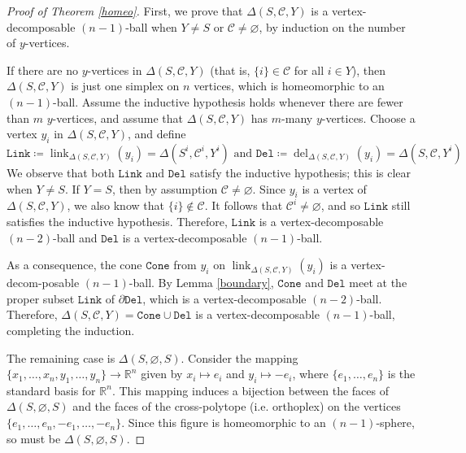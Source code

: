 \documentclass[ALCO,published]{cedram}
\numberwithin{equation}{section}
\newcommand{\R}{\mathbb{R}}
\newcommand{\sC}{\mathscr{C}}
\newcommand{\D}{\mathtt{Del}}
\renewcommand{\emptyset}{\varnothing}
\newcommand{\dee}{\partial}
\newcommand{\Cone}{\mathtt{Cone}}
\DeclareMathOperator{\del}{\mathrm{del}}
\DeclareMathOperator{\link}{\mathrm{link}}
\newcommand{\Link}{\mathtt{Link}}
\newcommand{\1}{^{-1}}
\begin{document}

\begin{proof}[Proof of Theorem \ref{homeo}]
First, we prove that $\Delta(S,\sC,Y)$ is a vertex-decomposable $(n-1)$-ball when $Y\neq S$ or $\sC\neq \emptyset$, by induction on the number of $y$-vertices.

If there are no $y$-vertices in $\Delta(S,\sC,Y)$ (that is, $\{i\}\in \sC$ for all $i\in Y$), then $\Delta(S,\sC,Y)$ is just one simplex on $n$ vertices, which is homeomorphic to an $(n-1)$-ball. Assume the inductive hypothesis holds whenever there are fewer than $m$ $y$-vertices, and assume that $\Delta(S,\sC,Y)$ has $m$-many $y$-vertices.  Choose a vertex $y_i$ in $\Delta(S,\sC,Y)$, and define 
\[\Link \coloneqq \link_{\Delta(S,\sC,Y)}(y_i) = \Delta(S^i,\sC^i,Y^i)\text{ and } \D \coloneqq \del_{\Delta(S,\sC,Y)}(y_i) = \Delta(S,\sC,Y^i)\]
We observe that both $\Link$ and $\D$ satisfy the inductive hypothesis; this is clear when $Y\neq S$.  If $Y=S$, then by assumption $\sC\neq\emptyset$.  Since $y_i$ is a vertex of $\Delta(S,\sC,Y)$, we also know that $\{i\}\not\in \sC$.  It follows that $\sC^i\neq\emptyset$, and so $\Link$ still satisfies the inductive hypothesis.  Therefore, $\Link$ is a vertex-decomposable $(n-2)$-ball and $\D$ is a vertex-decomposable $(n-1)$-ball. 




%
%



As a consequence, the cone $\Cone$ from $y_i$ on $\link_{\Delta(S,\sC,Y)}(y_i)$ is a vertex-decom-posable $(n-1)$-ball. By Lemma \ref{boundary}, $\Cone$ and $\D$ meet at the proper subset $\Link$ of $\dee \D$, which is a vertex-decomposable $(n-2)$-ball. Therefore, $\Delta(S,\sC,Y) = \Cone \cup \D$ is a vertex-decomposable $(n-1)$-ball, completing the induction.

The remaining case is $\Delta(S,\emptyset,S)$. Consider the mapping $\{x_1,\dots,x_n,y_1,\dots,y_n\} \to \R^n$ given by $x_i \mapsto e_i$ and $y_i \mapsto -e_i$, where $\{e_1,\dots,e_n\}$ is the standard basis for $\R^n$. This mapping induces a bijection between the faces of $\Delta(S,\emptyset,S)$ and the faces of the cross-polytope (i.e. orthoplex) on the vertices $\{e_1,\dots,e_n,-e_1,\dots,-e_n\}$. Since this figure is homeomorphic to an $(n-1)$-sphere, so must be $\Delta(S,\emptyset,S)$.
\end{proof}
\end{document}
